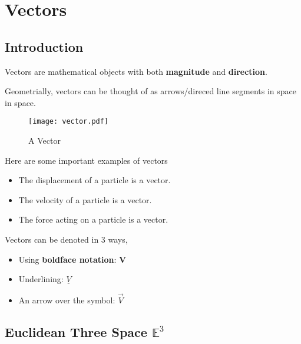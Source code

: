 \chapter{Vectors}

\section{Introduction}

\begin{definition}[Vectors]
  Vectors are mathematical objects with both {\bf magnitude} and {\bf direction}.
\end{definition}
Geometrially, vectors can be thought of as arrows/direced line segments in space in space.
\begin{figure}[H]
\centering
   \texttt{[image: vector.pdf]}
   \caption{A Vector}
   \label{fig:figure-1-vector}
\end{figure}


\begin{eg}
  Here are some important examples of vectors\\
  \vspace{-10px}
  \begin{itemize}
    \item The displacement of a particle is a vector.
    \item The velocity of a particle is a vector.
    \item The force acting on a particle is a vector.
  \end{itemize}

\end{eg}

\begin{notation}
  Vectors can be denoted in 3 ways,
  \begin{itemize}
    \item Using {\bf boldface notation}: $\boldsymbol{V}$
    \item Underlining:  $\underline{V}$ 
    \item An arrow over the symbol: $\vec{V}$

  \end{itemize}


\end{notation}

\section{Euclidean Three Space $\mathbb{E}^3$}

